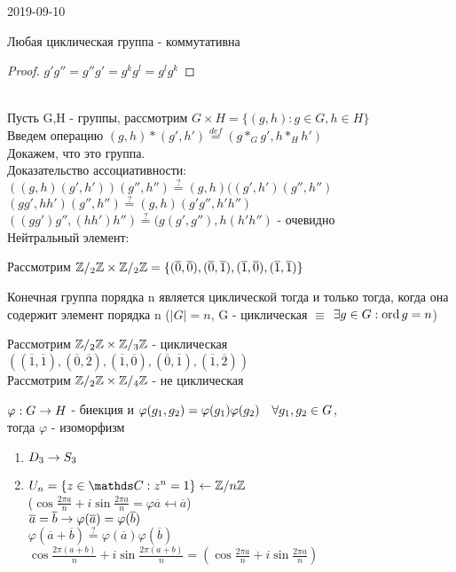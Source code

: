 \documentclass[main]{subfiles}
\begin{document}
\begin{lect} {2019-09-10}
	\begin{remark}
	    Любая циклическая группа - коммутативна
	\end{remark}

	\begin{proof}
	    $g' g'' = g'' g' = g^k g^l = g^l g^k$
	\end{proof}
	\\
	Пусть G,H - группы, рассмотрим $G \times H = \{(g,h): g\in G, h\in H\}$\\
	Введем операцию $(g,h)*(g',h')\overset{def}{=}(g*_G g', h*_H h')$\\
	Докажем, что это группа.\\
	Доказательство ассоциативности:
	$((g,h)(g',h'))(g'',h'') \overset{?}{=} (g,h)((g',h')(g'',h'')$\\
	$(gg',hh')(g'',h'') \overset{?}{=} (g,h)(g' g'', h' h'')$\\
	$((gg')g'',(hh')h'') \overset{?}{=} (g(g',g''),h(h'h'')$ - очевидно\\
	Нейтральный элемент:

	Рассмотрим $\mathbb{Z} /_2 \mathbb{Z} \times \mathbb{Z} /_2 \mathbb{Z} = \{(\overline{0},\overline{0}),(\overline{0},\overline{1}),(\overline{1},\overline{0}),(\overline{1},\overline{1})\}$

	\begin{definition}
	    Конечная группа порядка n является циклической тогда и только тогда, когда она содержит элемент порядка n ($|G|=n$, G - циклическая $\equiv$ $\exists g \in G: \mathop{\rm ord}\nolimits g = n$)
	\end{definition}
	Рассмотрим $\mathbb{Z} /_2 \mathbb{Z} \times \mathbb{Z} /_3 \mathbb{Z}$ - циклическая\\
	$((\overline{1},\overline{1}), (\overline{0}, \overline{2}), (\overline{1}, \overline{0}), (\overline{0}, \overline{1}), (\overline{1},\overline{2}))$\\
	Рассмотрим $\mathbb{Z} /_2 \mathbb{Z} \times \mathbb{Z} /_4 \mathbb{Z}$ - не циклическая

	\begin{definition}
	    $\varphi: G \rightarrow H$ - биекция и $\varphi(g_1,g_2)=\varphi(g_1) \varphi(g_2)\quad \forall g_1,g_2 \in G$,\\ тогда $\varphi$ - изоморфизм
	\end{definition}

	\begin{examples}
	    \begin{enumerate}
	        \item $D_3 \rightarrow S_3$
	        \item $U_n=\{z\in \CC: z^n=1\} \la \Z / n \Z$\\
	        ($\cos \frac{2\pi a}{n}+i \sin \frac{2\pi a}{n} = \varphi \overline{a} \mapsfrom \overline{a}$)\\
	        $\overline{a}=\overline{b} \rightarrow \varphi(\overline{a})=\varphi(\overline{b})$\\
	        $\varphi(\overline{a}+\overline{b}) \overset{?}{=} \varphi(\overline{a})\varphi(\overline{b})$\\
	        $\cos \frac{2\pi(a+b)}{n}+i \sin \frac{2\pi(a+b)}{n}=(\cos\frac{2\pi a}{n} + i \sin \frac{2\pi a}{n})$
	    \end{enumerate}
	\end{examples}


\end{lect}
\end{document}
